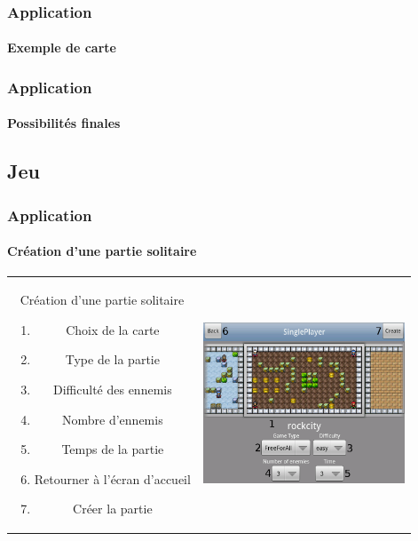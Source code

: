 	\begin{frame}
	\frametitle{Application}
	\framesubtitle{Exemple de carte}
	
	\end{frame}
	
	\begin{frame}
	\frametitle{Application}
	\framesubtitle{Possibilités finales}
	
	\end{frame}

\subsection{Jeu}
	
	\begin{frame}
	\frametitle{Application}
	\framesubtitle{Création d'une partie solitaire}
	
		\begin{tabular}{cc}
			\begin{minipage}{5cm}
				Création d'une partie solitaire
				\begin{enumerate}
					\item Choix de la carte
					\item Type de la partie
					\item Difficulté des ennemis
					\item Nombre d'ennemis
					\item Temps de la partie
					\item Retourner à l'écran d'accueil
					\item Créer la partie
				\end{enumerate}
			\end{minipage} &
			\begin{minipage}{7cm}
				\includegraphics[width=6cm]{img/singleplayerbis.png} 
			\end{minipage}\\
		\end{tabular}
	
	\end{frame}
	
